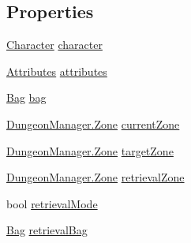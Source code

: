 \subsection*{Properties}
\begin{DoxyCompactItemize}
\item 
\mbox{\hyperlink{class_character}{Character}} \mbox{\hyperlink{class_player_data_a15faab09286a8d43714c7659a9d1b6bd}{character}}
\item 
\mbox{\hyperlink{class_attributes}{Attributes}} \mbox{\hyperlink{class_player_data_a0cb768b809c4518326a7f5092ef6fb76}{attributes}}
\item 
\mbox{\hyperlink{class_bag}{Bag}} \mbox{\hyperlink{class_player_data_a30f64ffcbf5541044cadb3e5b038acb7}{bag}}
\item 
\mbox{\hyperlink{class_dungeon_manager_a6558d4a01889674bf25c798f1b90a431}{Dungeon\+Manager.\+Zone}} \mbox{\hyperlink{class_player_data_a8e1bd4482b28bb85156d2aef7be04809}{current\+Zone}}
\item 
\mbox{\hyperlink{class_dungeon_manager_a6558d4a01889674bf25c798f1b90a431}{Dungeon\+Manager.\+Zone}} \mbox{\hyperlink{class_player_data_a5671b8f488e96c5263bb062200ae781a}{target\+Zone}}
\item 
\mbox{\hyperlink{class_dungeon_manager_a6558d4a01889674bf25c798f1b90a431}{Dungeon\+Manager.\+Zone}} \mbox{\hyperlink{class_player_data_aed5e24eed1db76e3d8954ab05e8f342c}{retrieval\+Zone}}
\item 
bool \mbox{\hyperlink{class_player_data_ae258f6bda605a5d3c9d4d701af4bf4d4}{retrieval\+Mode}}
\item 
\mbox{\hyperlink{class_bag}{Bag}} \mbox{\hyperlink{class_player_data_a7ce87c3307030f2a67f5628ca1c69c82}{retrieval\+Bag}}
\end{DoxyCompactItemize}


